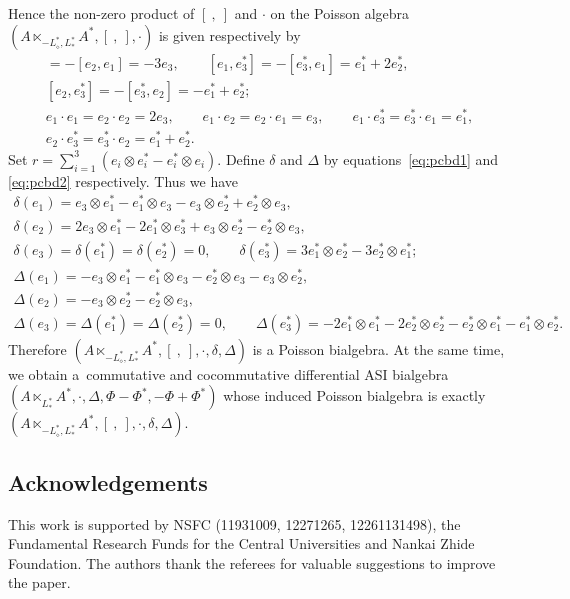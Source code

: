 \documentclass[pdftex]{sigma}
\numberwithin{equation}{section}
\begin{document}
\begin{Example}
\begin{equation*}
 \end{equation*}
 Hence the non-zero product of $[\ ,\ ]$ and $\cdot$ on the Poisson algebra $(A \ltimes_{-L^*_{\diamond},L^*_{\ast}} A^*, [\ ,\ ], \cdot)$ is given respectively by
 \begin{gather*}
 [e_1, e_2] = -[e_2, e_1] = -3e_3, \qquad
 [e_1, e_3^*] = -[e_3^*, e_1] = e_1^* + 2 e_2^*, \\
 [e_2, e_3^*] = -[e_3^*, e_2] = -e_1^* + e_2^*;\\
 e_1 \cdot e_1 = e_2 \cdot e_2 = 2 e_3, \qquad
 e_1 \cdot e_2 = e_2 \cdot e_1 = e_3, \qquad
 e_1 \cdot e_3^* = e_3^* \cdot e_1 = e_1^*, \\
 e_2 \cdot e_3^* = e_3^* \cdot e_2 = e_1^* + e_2^*.
 \end{gather*}
 Set $r = \sum_{i=1}^3 (e_i \otimes e_i^* - e_i^* \otimes e_i)$.
 Define $\delta$ and $\Delta$ by equations~\eqref{eq:pcbd1} and \eqref{eq:pcbd2} respectively.
 Thus we have
 \begin{gather*}
 \delta(e_1) = e_3 \otimes e_1^* - e_1^* \otimes e_3 - e_3 \otimes e_2^* + e_2^* \otimes e_3, \\
 \delta(e_2) = 2 e_3 \otimes e_1^* - 2 e_1^* \otimes e_3^* + e_3 \otimes e_2^* - e_2^* \otimes e_3,\\
 \delta(e_3) = \delta(e_1^*) = \delta(e_2^*) = 0, \qquad \delta(e_3^*) = 3 e_1^* \otimes e_2^* - 3 e_2^* \otimes e_1^*;\\
 \Delta(e_1) = - e_3 \otimes e_1^* - e_1^* \otimes e_3 - e_2^* \otimes e_3 - e_3 \otimes e_2^*, \\
 \Delta(e_2) = - e_3 \otimes e_2^* - e_2^* \otimes e_3, \\
 \Delta(e_3) = \Delta(e_1^*) = \Delta(e_2^*) = 0, \qquad \Delta(e_3^*) = -2 e_1^* \otimes e_1^* -2 e_2^* \otimes e_2^* - e_2^* \otimes e_1^* - e_1^* \otimes e_2^*.
 \end{gather*}
 Therefore $(A \ltimes_{-L^*_{\diamond},L^*_{\ast}} A^*, [\ ,\ ], \cdot, \delta, \Delta)$ is a Poisson bialgebra.
At the same time, we obtain a~commutative and cocommutative differential ASI bialgebra $(A \ltimes_{L^*_{\ast}} A^*, \cdot, \Delta, \Phi - \Phi^*, -\Phi + \Phi^*)$
 whose induced Poisson bialgebra is exactly $(A \ltimes_{-L^*_{\diamond},L^*_{\ast}} A^*, [\ ,\ ], \cdot, \delta,\Delta)$.
\end{Example}

\subsection*{Acknowledgements}
This work is supported by NSFC (11931009, 12271265, 12261131498), the Fundamental Research Funds for the Central Universities and Nankai Zhide Foundation.
The authors thank the referees for valuable suggestions to improve the paper.
\end{document}
